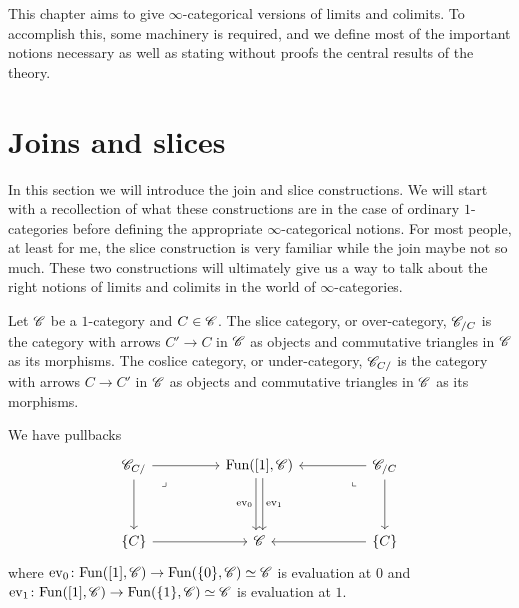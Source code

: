 \documentclass[../../thesis.tex]{subfiles}
\begin{document}
This chapter aims to give $\infty$-categorical versions of limits and colimits.
To accomplish this, some machinery is required, and we define most of the important notions necessary as well as stating without proofs the central results of the theory.
\section{Joins and slices}
In this section we will introduce the join and slice constructions.
We will start with a recollection of what these constructions are in the case of ordinary $1$-categories before defining the appropriate $\infty$-categorical notions.
For most people, at least for me, the slice construction is very familiar while the join maybe not so much.
These two constructions will ultimately give us a way to talk about the right notions of limits and colimits in the world of $\infty$-categories.
\begin{definition}\label{sliceobj}
    Let $\mathscr{C}$ be a $1$-category and $C\in \mathscr{C}$.
    The slice category, or over-category, $\mathscr{C}_{/C}$ is the category with arrows $C'\to C$ in $\mathscr{C}$ as objects and commutative triangles in $\mathscr{C}$ as its morphisms.
    The coslice category, or under-category, $\mathscr{C}_{C/}$ is the category with arrows $C\to C'$ in $\mathscr{C}$ as objects and commutative triangles in $\mathscr{C}$ as its morphisms.
\end{definition}
\begin{remark}
    We have pullbacks
    \[\begin{tikzcd}
            {\C_{C/}} && {\Fun([1],\C)} && {\C_{/C}} \\
            \\
            {\{C\}} && \C && {\{C\}}
            \arrow[from=3-1, to=3-3]
            \arrow[from=1-1, to=3-1]
            \arrow[from=1-1, to=1-3]
            \arrow[shift right=1,"{\mathrm{ev}_0}"', from=1-3, to=3-3]
            \arrow[from=1-5, to=1-3]
            \arrow[from=1-5, to=3-5]
            \arrow[from=3-5, to=3-3]
            \arrow[shift left=1,"{\mathrm{ev}_1}", from=1-3, to=3-3]
            \arrow["\lrcorner"{anchor=center, pos=0.125, rotate=-90}, draw=none, from=1-5, to=3-3]
            \arrow["\lrcorner"{anchor=center, pos=0.125}, draw=none, from=1-1, to=3-3]
        \end{tikzcd}\]
    where $\mathrm{ev}_0 \colon \mathrm{Fun}([1],\mathscr{C}) \to \mathrm{Fun}(\{0\}, \mathscr{C}) \simeq \mathscr{C}$ is evaluation at $0$ and $\mathrm{ev}_1 \colon \mathrm{Fun}([1],\mathscr{C}) \to \mathrm{Fun}(\{1\}, \mathscr{C}) \simeq \mathscr{C}$ is evaluation at $1$.
\end{remark}
\end{document}
